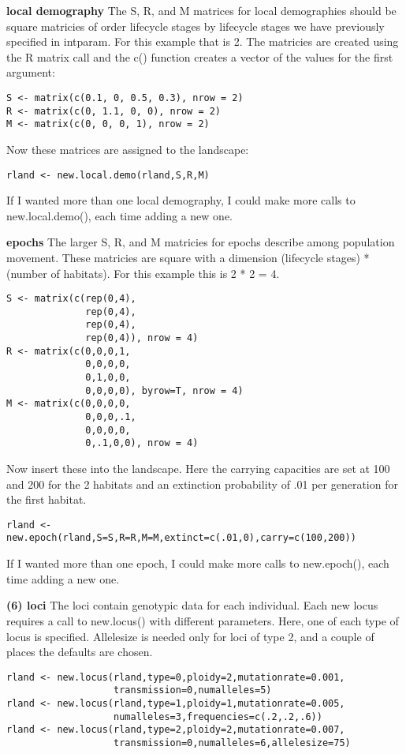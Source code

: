 \documentclass{article}
\begin{document}
\begin{list}{}{\setlength{\labelsep}{10pt} \setlength{\leftmargin}{40pt}}
\textbf{local demography}
The S, R, and M matrices for local demographies should be square matricies of order lifecycle stages by lifecycle stages we have previously specified in intparam.  For this example that is 2.  The matricies are created using the R matrix call and the c() function creates a vector of the values for the first argument:
\begin{verbatim}
S <- matrix(c(0.1, 0, 0.5, 0.3), nrow = 2)
R <- matrix(c(0, 1.1, 0, 0), nrow = 2)
M <- matrix(c(0, 0, 0, 1), nrow = 2)
\end{verbatim}
Now these matrices are assigned to the landscape:
\begin{verbatim}
rland <- new.local.demo(rland,S,R,M)
\end{verbatim}
If I wanted more than one local demography, I could make more calls to new.local.demo(), each time adding a new one.

\textbf{epochs}
The larger S, R, and M matricies for epochs describe among population movement.  These matricies are square with a dimension (lifecycle stages) * (number of habitats).  For this example this is 2 * 2 = 4.
\begin{verbatim}
S <- matrix(c(rep(0,4),
              rep(0,4),
              rep(0,4),
              rep(0,4)), nrow = 4)
R <- matrix(c(0,0,0,1,
              0,0,0,0,
              0,1,0,0,
              0,0,0,0), byrow=T, nrow = 4)
M <- matrix(c(0,0,0,0,
              0,0,0,.1,
              0,0,0,0,
              0,.1,0,0), nrow = 4)
\end{verbatim}
Now insert these into the landscape.  Here the carrying capacities are set at 100 and 200 for the 2 habitats and an extinction probability of .01 per generation for the first habitat.
\begin{verbatim}
rland <- new.epoch(rland,S=S,R=R,M=M,extinct=c(.01,0),carry=c(100,200))
\end{verbatim}
If I wanted more than one epoch, I could make more calls to new.epoch(), each time adding a new one.

\item[\textbf{(6) loci}]
The loci contain genotypic data for each individual.  Each new locus requires a call to new.locus() with different parameters.  Here, one of each type of locus is specified.  Allelesize is needed only for loci of type 2, and a couple of places the defaults are chosen.
\begin{verbatim}
rland <- new.locus(rland,type=0,ploidy=2,mutationrate=0.001,
                   transmission=0,numalleles=5)
rland <- new.locus(rland,type=1,ploidy=1,mutationrate=0.005,
                   numalleles=3,frequencies=c(.2,.2,.6))
rland <- new.locus(rland,type=2,ploidy=2,mutationrate=0.007,
                   transmission=0,numalleles=6,allelesize=75)
\end{verbatim}


\end{list}
\end{document}
